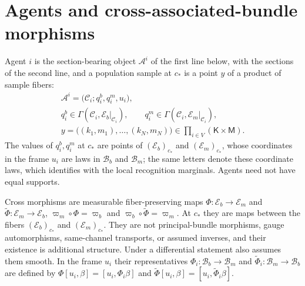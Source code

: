 \section{Agents and cross-associated-bundle morphisms}
\label{sec:geo-agents}
\label{sec:geo-cross-morphisms}

Agent $i$ is the section-bearing object $\mathcal A^i$ of the first line below, with the sections of
the second line, and a population sample at $c_*$ is a point $y$ of a product of sample fibers:
\begin{gather}
\mathcal A^i=\bigl(\mathcal C_i;q_i^b,q_i^m,u_i\bigr),
\label{eq:geo-agent-object}\\
q_i^b\in\Gamma(\mathcal C_i,\mathcal E_b|_{\mathcal C_i}),
\qquad
q_i^m\in\Gamma(\mathcal C_i,\mathcal E_m|_{\mathcal C_i}),
\label{eq:geo-agent-sections}\\
y=\bigl((k_1,m_1),\ldots,(k_N,m_N)\bigr)\in\prod_{i\in V}(\mathsf K\times\mathsf M).
\label{eq:geo-population-sample}
\end{gather}
The values of $q_i^b,q_i^m$ at $c_*$ are points of $(\mathcal E_b)_{c_*}$ and $(\mathcal E_m)_{c_*}$, whose
coordinates in the frame $u_i$ are laws in $\mathcal B_b$ and $\mathcal B_m$; the same letters denote
these coordinate laws, which  identifies with the local recognition
marginals. Agents need not have equal supports.

Cross morphisms are measurable fiber-preserving maps $\Phi:\mathcal E_b\to\mathcal E_m$ and
$\widetilde\Phi:\mathcal E_m\to\mathcal E_b$, $\varpi_m\circ\Phi=\varpi_b$ and
$\varpi_b\circ\widetilde\Phi=\varpi_m$.\label{eq:geo-cross-channel-map} At $c_*$ they are maps between
the fibers $(\mathcal E_b)_{c_*}$ and $(\mathcal E_m)_{c_*}$. They are not principal-bundle morphisms, gauge automorphisms, same-channel transports, or assumed inverses,
and their existence is additional structure. Under  a differential
statement also assumes them smooth. In the frame $u_i$ their representatives
$\Phi_i:\mathcal B_b\to\mathcal B_m$ and $\widetilde\Phi_i:\mathcal B_m\to\mathcal B_b$ are defined
by $\Phi[u_i,\beta]=[u_i,\Phi_i\beta]$ and $\widetilde\Phi[u_i,\beta]=[u_i,\widetilde\Phi_i\beta]$.

